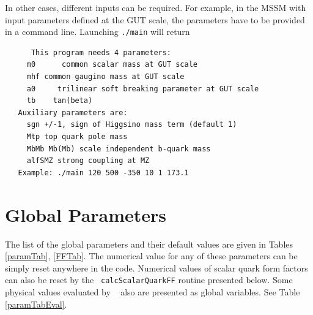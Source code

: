 \documentclass[12pt,a4paper]{article}
\begin{document}
In other cases, different inputs can be required. For example, in the MSSM with input parameters defined at the GUT scale,
the parameters have to be provided in a command line. Launching \verb|./main| will return 
\begin{verbatim}
      This program needs 4 parameters:
     m0      common scalar mass at GUT scale
     mhf common gaugino mass at GUT scale
     a0     trilinear soft breaking parameter at GUT scale
     tb    tan(beta)
   Auxiliary parameters are:
     sgn +/-1, sign of Higgsino mass term (default 1)
     Mtp top quark pole mass
     MbMb Mb(Mb) scale independent b-quark mass
     alfSMZ strong coupling at MZ
   Example: ./main 120 500 -350 10 1 173.1
\end{verbatim}



\section{Global Parameters}

 The list of the
global parameters  and their default values  are given  in Tables
\ref{paramTab}, \ref{FFTab}. 
The numerical value for any of these parameters can be simply reset anywhere in the code. 
Numerical values of scalar quark form factors can also be reset by the {\tt
calcScalarQuarkFF} routine presented below. Some physical values  evaluated by \micro~  also are presented as global variables. See Table \ref{paramTabEval}. 
\end{document}
